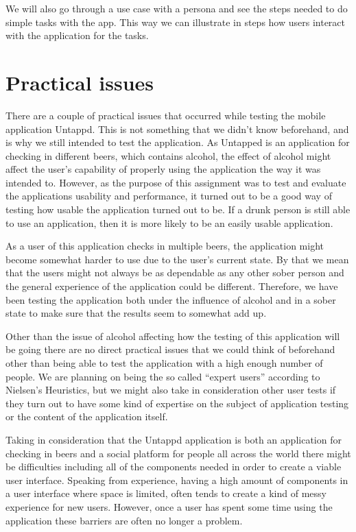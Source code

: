 \documentclass[12pt]{article}
\begin{document}
We will also go through a use case with a persona and see the steps needed to do
simple tasks with the app. This way we can illustrate in steps how users
interact with the application
for the tasks.


\section{Practical issues}
 
There are a couple of practical issues that occurred while testing the mobile
application Untappd. This is not something that we didn’t know beforehand, and
is why we still intended to test the application. As Untapped is an application
for checking in different beers, which contains alcohol, the effect of alcohol
might affect the user’s capability of properly using the application the way it
was intended to. However, as the purpose of this assignment was to test and
evaluate the applications usability and performance, it turned out to be a good
way of testing how usable the application turned out to be. If a drunk person is
still able to use an application, then it is more likely to be an easily usable
application.
 
As a user of this application checks in multiple beers, the application might
become somewhat harder to use due to the user’s current state. By that we mean
that the users might not always be as dependable as any other sober person and
the general experience of the application could be different. Therefore, we have
been testing the application both under the influence of alcohol and in a sober
state to make sure that the results seem to somewhat add up.
 
Other than the issue of alcohol affecting how the testing of this application
will be going there are no direct practical issues that we could think of
beforehand other than being able to test the application with a high enough
number of people. We are planning on being the so called “expert users”
according to Nielsen’s Heuristics, but we might also take in consideration other
user tests if they turn out to have some kind of expertise on the subject of
application testing or the content of the application itself.

Taking in consideration that the Untappd application is both an application for
checking in beers and a social platform for people all across the world there
might be difficulties including all of the components needed in order to create
a viable user interface. Speaking from experience, having a high amount of
components in a user interface where space is limited, often tends to create a
kind of messy experience for new users. However, once a user has spent some time
using the application these barriers are often no longer a problem. 
\end{document}
